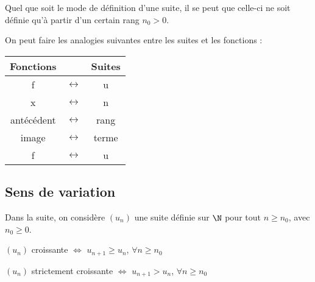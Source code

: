 \documentclass[11pt]{article}
\begin{document}
\begin{remarque}
Quel que soit le mode de définition
d'une suite, il se peut que celle-ci
ne soit définie qu'à partir d'un
certain rang $n_0 > 0$.
\end{remarque}

\begin{remarque}
On peut faire les analogies suivantes
entre les suites et les fonctions :

\begin{center}
\begin{tabular}{|c|c|c|}
\hline
Fonctions&&Suites \\ \hline
f&$\leftrightarrow$&u \\ \hline
x&$\leftrightarrow$&n \\ \hline
antécédent&$\leftrightarrow$&rang \\ \hline
image&$\leftrightarrow$&terme \\ \hline
f&$\leftrightarrow$&u \\ \hline
\end{tabular}
\end{center}
\end{remarque}

\subsection{Sens de variation}

\begin{remarque}
Dans la suite, on considère $(u_n)$
une suite définie sur $\N$ pour tout
$n \ge n_0$, avec $n_0 \ge 0$.
\end{remarque}

\begin{definition}
$(u_n)$ croissante $\iff$ $u_{n+1}
\ge u_n$, $\forall n \ge n_0$
\end{definition}

\begin{exemple}

\end{exemple}

\begin{definition}
$(u_n)$ strictement croissante $\iff$ $u_{n+1}
> u_n$, $\forall n \ge n_0$
\end{definition}

\begin{exemple}

\end{exemple}
\end{document}
